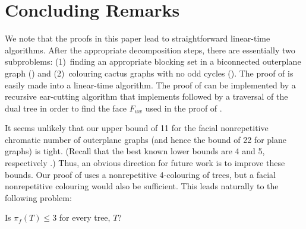 \documentclass{cccg16}
\begin{document}
\section{Concluding Remarks}

We note that the proofs in this paper lead to straightforward linear-time
algorithms.  After the appropriate decomposition steps, there are
essentially two subproblems: (1)~finding an appropriate blocking
set in a biconnected outerplane graph () and
(2)~colouring cactus graphs with no odd cycles (). The
proof of  is easily made into a linear-time algorithm. The
proof of  can be implemented by a recursive
ear-cutting algorithm that implements  followed by
a traversal of the dual tree in order to find the face $F_{uw}$ used in
the proof of .

It seems unlikely that our upper bound of 11 for the facial nonrepetitive
chromatic number of outerplane graphs (and hence the bound of 22 for
plane graphs) is tight.  (Recall that the best known lower bounds
are 4 and 5, respectively \cite{barat2013facial}.)  Thus, an obvious
direction for future work is to improve these bounds.  Our proof of
 uses a nonrepetitive 4-colouring of trees, but a
facial nonrepetitive colouring would also be sufficient.  This leads
naturally to the following problem:

\begin{op}
   Is $\pi_f(T) \le 3$ for every tree, $T$? 
\end{op}





\end{document}
